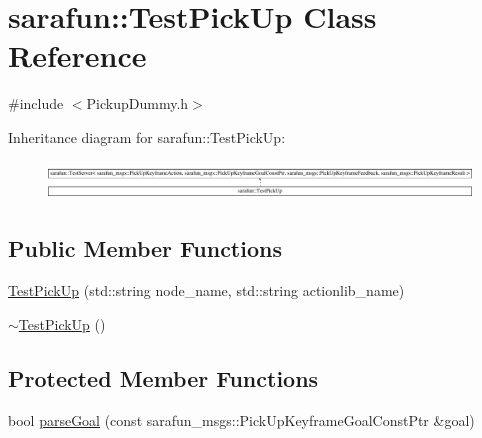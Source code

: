 \hypertarget{classsarafun_1_1TestPickUp}{\section{sarafun\-:\-:Test\-Pick\-Up Class Reference}
\label{classsarafun_1_1TestPickUp}
}


{\ttfamily \#include $<$Pickup\-Dummy.\-h$>$}

Inheritance diagram for sarafun\-:\-:Test\-Pick\-Up\-:\begin{figure}[H]
\begin{center}
\leavevmode
\includegraphics[height=1.027523cm]{classsarafun_1_1TestPickUp}
\end{center}
\end{figure}
\subsection*{Public Member Functions}
\begin{DoxyCompactItemize}
\item 
\hyperlink{classsarafun_1_1TestPickUp_a2d06467282615b0dc55e7d5e0602abf1}{Test\-Pick\-Up} (std\-::string node\-\_\-name, std\-::string actionlib\-\_\-name)
\item 
\hyperlink{classsarafun_1_1TestPickUp_a4f2b56a24cc26f1224920e0e9aba67c3}{$\sim$\-Test\-Pick\-Up} ()
\end{DoxyCompactItemize}
\subsection*{Protected Member Functions}
\begin{DoxyCompactItemize}
\item 
bool \hyperlink{classsarafun_1_1TestPickUp_a93fab913243b9446cdcfc8042c9a696b}{parse\-Goal} (const sarafun\-\_\-msgs\-::\-Pick\-Up\-Keyframe\-Goal\-Const\-Ptr \&goal)
\end{DoxyCompactItemize}


